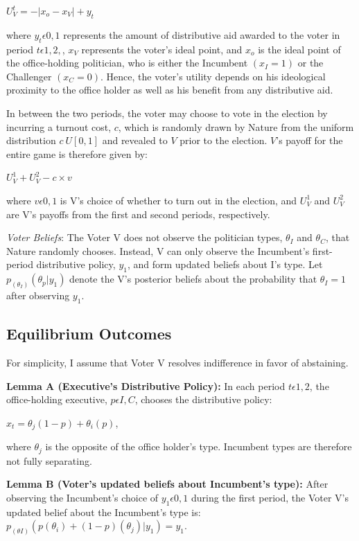 \documentclass[12pt]{paper}
\begin{document}
$U_{V}^t = -|x_o - x_V| + y_t$

where $y_t\epsilon{0,1}$ represents the amount of distributive aid awarded to the voter in period $t\epsilon{1,2},$, $x_V$ represents the voter’s ideal point, and $x_o$ is the ideal point of the office-holding politician, who is either the Incumbent $(x_I=1)$ or the Challenger $(x_C=0).$ Hence, the voter’s utility depends on his ideological proximity to the office holder as well as his benefit from any distributive aid.

In between the two periods, the voter may choose to vote in the election by incurring a turnout cost, $c$, which is randomly drawn by Nature from the uniform distribution $c~U[0,1]$ and revealed to $V$ prior to the election. $V$’s payoff for the entire game is therefore given by:

$U_{V}^1 + U_{V}^2 - c \times v$

where $v\epsilon{0,1}$ is V’s choice of whether to turn out in the election, and $U_{V}^1$ and $U_{V}^2$ are V’s payoffs from the first and second periods, respectively.

\emph{Voter Beliefs}: The Voter V does not observe the politician types, $\theta_I$ and $\theta_C$, that Nature randomly chooses. Instead, V can only observe the Incumbent's first-period distributive policy,  $y_1$, and form updated beliefs about I’s type. Let $p_(\theta_I ) (\theta_p | y_1 )$ denote the V’s posterior beliefs about the probability that $\theta_I=1$ after observing $y_1$.

\subsection{Equilibrium Outcomes}
	For simplicity, I assume that Voter V resolves indifference in favor of abstaining.
	
\textbf{Lemma A (Executive’s Distributive Policy):} In each period $t\epsilon{1,2}$, the office-holding executive, $p\epsilon{I,C}$, chooses the distributive policy: 

$x_t=\theta_j (1-p)+ \theta_i (p)$, 

where $\theta_j$ is the opposite of the office holder’s type. Incumbent types are therefore not fully separating. 


\textbf{Lemma B (Voter’s updated beliefs about Incumbent’s type):}  After observing the Incumbent’s choice of $y_1 \epsilon {0,1}$ during the first period, the Voter V’s updated belief about the Incumbent’s type is: $p_(\theta I) (p(\theta_i ) + (1 - p)(\theta_j ) | y_1 )=y_1$.
\end{document}
